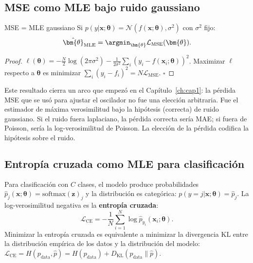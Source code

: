 \subsection{MSE como MLE bajo ruido gaussiano}
\label{subsec:mse_mle}

\begin{proposicion}{MSE = MLE gaussiano}
\label{prop:mse_mle}
Si $p(y|\bm{x};\bm{\theta}) = \mathcal{N}(f(\bm{x};\bm{\theta}),
\sigma^2)$ con $\sigma^2$ fijo:
\begin{equation}
  \hat{\bm{\theta}}_{\text{MLE}}
  = \argmin_{\bm{\theta}}\mathcal{L}_{\text{MSE}}(\bm{\theta}).
  \label{eq:mse_mle}
\end{equation}
\end{proposicion}

\begin{proof}
$\ell(\bm{\theta}) = -\frac{N}{2}\log(2\pi\sigma^2) -
\frac{1}{2\sigma^2}\sum_i(y_i-f(\bm{x}_i;\bm{\theta}))^2$.
Maximizar $\ell$ respecto a $\bm{\theta}$ es minimizar
$\sum_i(y_i-f_i)^2 = N\mathcal{L}_{\text{MSE}}$. $\square$
\end{proof}

Este resultado cierra un arco que empezó en el Capítulo~\ref{ch:cap1}:
la pérdida MSE que se usó para ajustar el oscilador no fue una elección
arbitraria. Fue el estimador de máxima verosimilitud bajo la hipótesis
(correcta) de ruido gaussiano. Si el ruido fuera laplaciano, la pérdida
correcta sería MAE; si fuera de Poisson, sería la log-verosimilitud de
Poisson. La elección de la pérdida codifica la hipótesis sobre el ruido.

\subsection{Entropía cruzada como MLE para clasificación}
\label{subsec:ce_mle}

Para clasificación con $C$ clases, el modelo produce probabilidades
$\hat{p}_j(\bm{x};\bm{\theta}) = \text{softmax}(\bm{z})_j$ y la
distribución es categórica: $p(y=j|\bm{x};\bm{\theta}) = \hat{p}_j$.
La log-verosimilitud negativa es la \textbf{entropía cruzada}:
\begin{equation}
  \mathcal{L}_{\text{CE}} = -\frac{1}{N}\sum_{i=1}^N
  \log\hat{p}_{y_i}(\bm{x}_i;\bm{\theta}).
  \label{eq:ce}
\end{equation}
Minimizar la entropía cruzada es equivalente a minimizar la divergencia
KL entre la distribución empírica de los datos y la distribución del
modelo: $\mathcal{L}_{\text{CE}} = H(p_{\text{data}},\hat{p}) =
H(p_{\text{data}}) + D_{\text{KL}}(p_{\text{data}}\|\hat{p})$.

